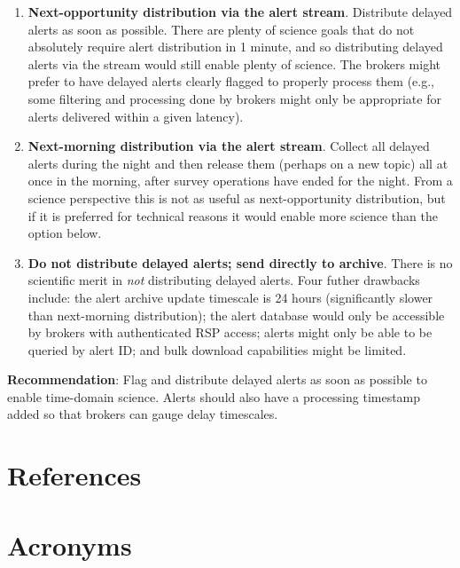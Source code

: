 \documentclass[DM,authoryear,toc]{lsstdoc}
\begin{document}
\begin{enumerate}
\item \textbf{Next-opportunity distribution via the alert stream}.
Distribute delayed alerts as soon as possible.
There are plenty of science goals that do not absolutely require alert distribution in 1 minute, and so distributing delayed 
alerts via the stream would still enable plenty of science.
The brokers might prefer to have delayed alerts clearly flagged to properly process them (e.g., some filtering and processing 
done by brokers might only be appropriate for alerts delivered within a given latency).
\item \textbf{Next-morning distribution via the alert stream}.
Collect all delayed alerts during the night and then release them (perhaps on a new topic) all at once in the morning, after 
survey operations have ended for the night.
From a science perspective this is not as useful as next-opportunity distribution, but if it is preferred for technical 
reasons it would enable more science than the option below.
\item \textbf{Do not distribute delayed alerts; send directly to archive}.
There is no scientific merit in \emph{not} distributing delayed alerts.
Four futher drawbacks include: the alert archive update timescale is 24 hours (significantly slower than next-morning distribution); 
the alert database would only be accessible by brokers with authenticated RSP access; alerts might only be able to be queried by 
alert ID; and bulk download capabilities might be limited.
\end{enumerate}

\textbf{Recommendation}: Flag and distribute delayed alerts as soon as possible to enable time-domain science.
Alerts should also have a processing timestamp added so that brokers can gauge delay timescales.

\appendix
\section{References} \label{sec:bib}
\renewcommand{\refname}{} %


\section{Acronyms} \label{sec:acronyms}

\end{document}

